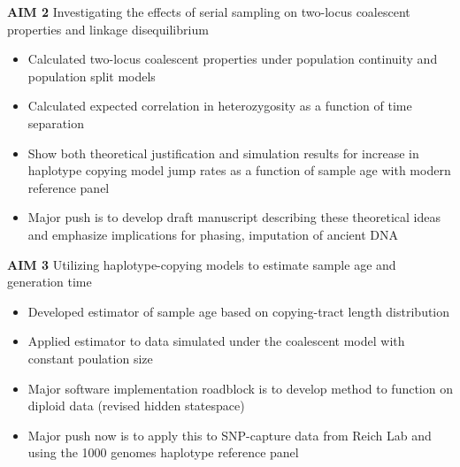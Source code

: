 \documentclass[a4paper, 11pt]{article}
\begin{document}
 \textbf{AIM 2} Investigating the effects of serial sampling on two-locus coalescent properties and linkage disequilibrium\\
  \begin{itemize}
    \item Calculated two-locus coalescent properties under population continuity and population split models
    \item Calculated expected correlation in heterozygosity as a function of time separation
    \item Show both theoretical justification and simulation results for increase in haplotype copying model jump rates as a function of sample age with modern reference panel
    \item Major push is to develop draft manuscript describing these theoretical ideas and emphasize implications for phasing, imputation of ancient DNA
  \end{itemize}


 \textbf{AIM 3} Utilizing haplotype-copying models to estimate sample age and generation time\\
  \begin{itemize}
    \item Developed estimator of sample age based on copying-tract length distribution
    \item Applied estimator to data simulated under the coalescent model with constant poulation size
    \item Major software implementation roadblock is to develop method to function on diploid data (revised hidden statespace)
    \item Major push now is to apply this to SNP-capture data from Reich Lab and using the 1000 genomes haplotype reference panel 
  \end{itemize}



\end{document}
